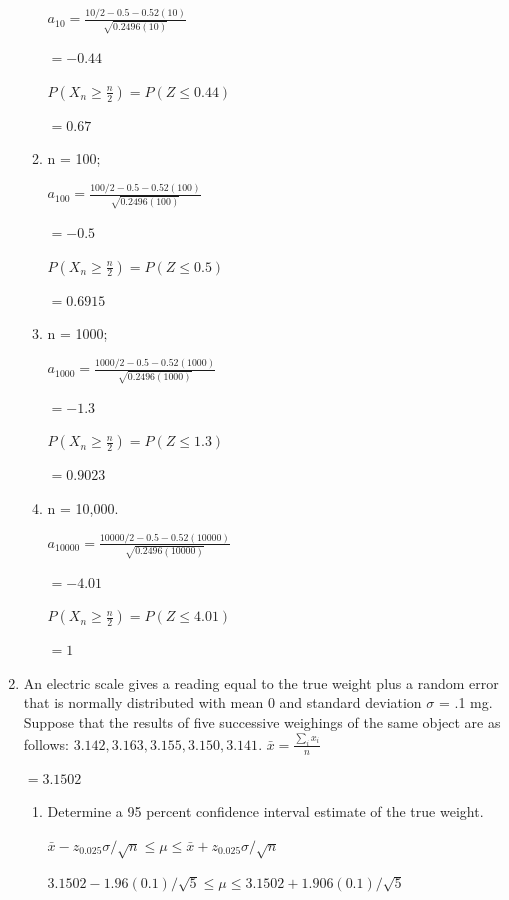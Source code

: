 \documentclass{article}
\begin{document}
\begin{enumerate}
\begin{enumerate}
        $a_{10} = \frac{10/2 - 0.5 -0.52(10)}{\sqrt{0.2496(10)}}$

        $= -0.44$

        $P\left(X_n \geq \frac{n}{2}\right) = P\left(Z \leq 0.44\right)$

        $= 0.67$
        \item n = 100;
        
        $a_{100} = \frac{100/2 - 0.5 -0.52(100)}{\sqrt{0.2496(100)}}$

        $= -0.5$

        $P\left(X_n \geq \frac{n}{2}\right) = P\left(Z \leq 0.5\right)$

        $= 0.6915$

        \item n = 1000;
        
        $a_{1000} = \frac{1000/2 - 0.5 -0.52(1000)}{\sqrt{0.2496(1000)}}$

        $= -1.3$

        $P\left(X_n \geq \frac{n}{2}\right) = P\left(Z \leq 1.3\right)$

        $= 0.9023$
        \item n = 10,000.
        
        $a_{10000} = \frac{10000/2 - 0.5 -0.52(10000)}{\sqrt{0.2496(10000)}}$

        $= -4.01$

        $P\left(X_n \geq \frac{n}{2}\right) = P\left(Z \leq 4.01\right)$

        $= 1$
    \end{enumerate}

    \item An electric scale gives a reading equal to the true weight plus a random error that is normally distributed with mean 0 and standard deviation $\sigma$ = .1 mg. Suppose that the results of five successive weighings of the same object are as follows: $3.142, 3.163, 3.155, 3.150, 3.141$.
    $\displaystyle \bar{x} = \frac{\sum_{i}{x_i}}{n}$

    $= 3.1502$
    \begin{enumerate}
        \item Determine a 95 percent confidence interval estimate of the true weight.
        
        $\bar{x} - z_{0.025}\sigma/\sqrt{n} \leq \mu \leq \bar{x} + z_{0.025}\sigma/\sqrt{n}$

        $3.1502 - 1.96(0.1)/\sqrt{5} \leq \mu \leq 3.1502 + 1.906(0.1)/\sqrt{5}$


\end{enumerate}
\end{enumerate}
\end{document}
